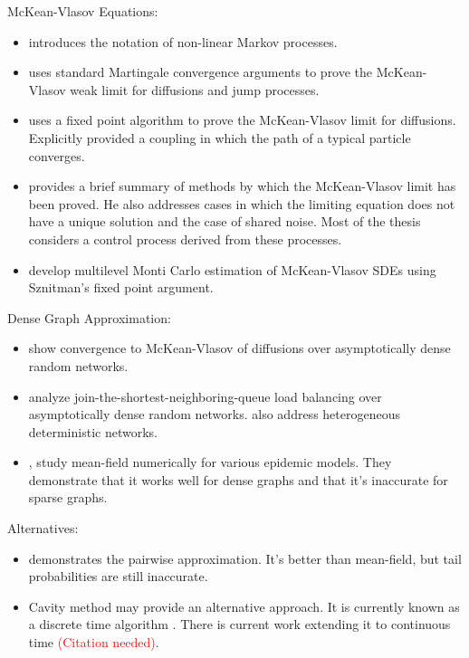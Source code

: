 \documentclass[12pt]{article}
\newcommand{\tr}{\textcolor{red}}
\begin{document}
McKean-Vlasov Equations:

\begin{itemize}
\item \cite{Mck66} introduces the notation of non-linear Markov processes.

\item \cite{Oel84} uses standard Martingale convergence arguments to prove the McKean-Vlasov weak limit for diffusions and jump processes.

\item \cite{Szn91} uses a fixed point algorithm to prove the McKean-Vlasov limit for diffusions. Explicitly provided a coupling in which the path of a typical particle converges.

\item \cite{Lac15} provides a brief summary of methods by which the McKean-Vlasov limit has been proved. He also addresses cases in which the limiting equation does not have a unique solution and the case of shared noise. Most of the thesis considers a control process derived from these processes.

\item \cite{SzpTanTse17} develop multilevel Monti Carlo estimation of McKean-Vlasov SDEs using Sznitman's fixed point argument.
\end{itemize}

Dense Graph Approximation:

\begin{itemize}
\item \cite{BhaBudWu17} show convergence to McKean-Vlasov of diffusions over asymptotically dense random networks.

\item \cite{MukBorLee17} analyze join-the-shortest-neighboring-queue load balancing over asymptotically dense random networks. \cite{BudMukWu17} also address heterogeneous deterministic networks.

\item \cite{MieBov15},\cite{GreKisKao06} study mean-field numerically for various epidemic models. They demonstrate that it works well for dense graphs and that it's inaccurate for sparse graphs.
\end{itemize}

Alternatives:

\begin{itemize}
\item \cite{Gas15} demonstrates the pairwise approximation. It's better than mean-field, but tail probabilities are still inaccurate.

\item Cavity method may provide an alternative approach. It is currently known as a discrete time algorithm \cite{Lac15}\cite{KanMon11}. There is current work extending it to continuous time \tr{(Citation needed)}.
\end{itemize}
\end{document}
